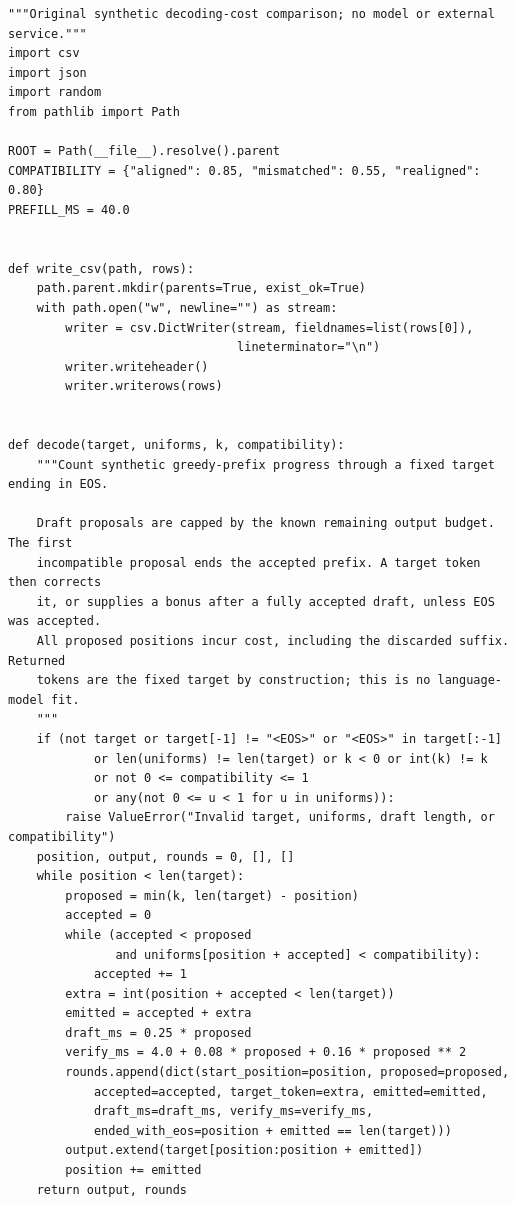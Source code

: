 \begin{Verbatim}[breaklines,breakanywhere,fontsize=\small]
"""Original synthetic decoding-cost comparison; no model or external service."""
import csv
import json
import random
from pathlib import Path

ROOT = Path(__file__).resolve().parent
COMPATIBILITY = {"aligned": 0.85, "mismatched": 0.55, "realigned": 0.80}
PREFILL_MS = 40.0


def write_csv(path, rows):
    path.parent.mkdir(parents=True, exist_ok=True)
    with path.open("w", newline="") as stream:
        writer = csv.DictWriter(stream, fieldnames=list(rows[0]),
                                lineterminator="\n")
        writer.writeheader()
        writer.writerows(rows)


def decode(target, uniforms, k, compatibility):
    """Count synthetic greedy-prefix progress through a fixed target ending in EOS.

    Draft proposals are capped by the known remaining output budget. The first
    incompatible proposal ends the accepted prefix. A target token then corrects
    it, or supplies a bonus after a fully accepted draft, unless EOS was accepted.
    All proposed positions incur cost, including the discarded suffix. Returned
    tokens are the fixed target by construction; this is no language-model fit.
    """
    if (not target or target[-1] != "<EOS>" or "<EOS>" in target[:-1]
            or len(uniforms) != len(target) or k < 0 or int(k) != k
            or not 0 <= compatibility <= 1
            or any(not 0 <= u < 1 for u in uniforms)):
        raise ValueError("Invalid target, uniforms, draft length, or compatibility")
    position, output, rounds = 0, [], []
    while position < len(target):
        proposed = min(k, len(target) - position)
        accepted = 0
        while (accepted < proposed
               and uniforms[position + accepted] < compatibility):
            accepted += 1
        extra = int(position + accepted < len(target))
        emitted = accepted + extra
        draft_ms = 0.25 * proposed
        verify_ms = 4.0 + 0.08 * proposed + 0.16 * proposed ** 2
        rounds.append(dict(start_position=position, proposed=proposed,
            accepted=accepted, target_token=extra, emitted=emitted,
            draft_ms=draft_ms, verify_ms=verify_ms,
            ended_with_eos=position + emitted == len(target)))
        output.extend(target[position:position + emitted])
        position += emitted
    return output, rounds



\end{Verbatim}
